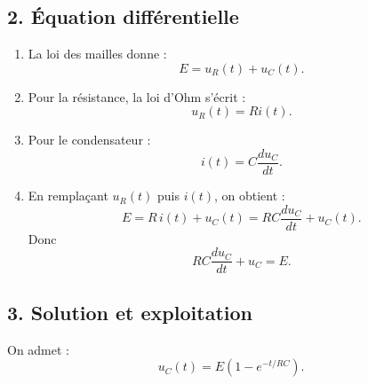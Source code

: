 \documentclass[11pt,a4paper]{article}
\begin{document}
\subsection*{2. Équation différentielle}

\begin{enumerate}
    \item La loi des mailles donne :
    \[
    E=u_R(t)+u_C(t).
    \]

    \item Pour la résistance, la loi d'Ohm s'écrit :
    \[
    u_R(t)=Ri(t).
    \]

    \item Pour le condensateur :
    \[
    i(t)=C\frac{du_C}{dt}.
    \]

    \item En remplaçant \(u_R(t)\) puis \(i(t)\), on obtient :
    \[
    E=R\,i(t)+u_C(t)=RC\frac{du_C}{dt}+u_C(t).
    \]
    Donc
    \[
    RC\frac{du_C}{dt}+u_C=E.
    \]
\end{enumerate}

\subsection*{3. Solution et exploitation}

On admet :
\[
u_C(t)=E\left(1-e^{-t/RC}\right).
\]
\end{document}
